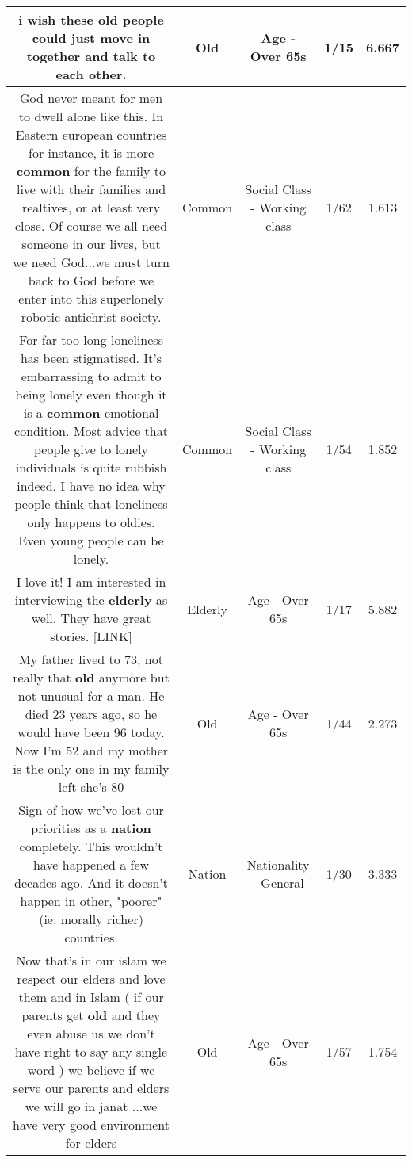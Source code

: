 \documentclass[11pt]{article}
\newlength\mylength
\begin{document}
\begin{center}
\begin{longtable}{|C{.65\mylength}|C{.30\mylength}|C{.12\mylength}|C{.12\mylength}|C{.12\mylength}|}
  \small i wish these \textbf{old} people could just move in together and talk to each other.\normalsize   & Old & Age - Over 65s & 1/15 & 6.667 \\  \hline
  \small God never meant for men to dwell alone like this. In Eastern european countries for instance, it is more \textbf{common} for the family to live with their families and realtives, or at least very close. Of course we all need someone in our lives, but we need God...we must turn back to God before we enter into this superlonely robotic antichrist society.\normalsize   & Common & Social Class - Working class & 1/62 & 1.613 \\  \hline
  \small For far too long loneliness has been stigmatised. It's embarrassing to admit to being lonely even though it is a \textbf{common} emotional condition. Most advice that people give to lonely individuals is quite rubbish indeed.  I have no idea why people think that loneliness only happens to oldies.   Even young people can be lonely.\normalsize   & Common & Social Class - Working class & 1/54 & 1.852 \\  \hline
  \small I love it! I am interested in interviewing the \textbf{elderly} as well. They have great stories.  [LINK] \normalsize   & Elderly & Age - Over 65s & 1/17 & 5.882 \\  \hline
  \small My father lived to 73, not really that \textbf{old} anymore but not unusual for a man. He died 23 years ago, so he would have been 96 today. Now I'm 52 and my mother is the only one in my family left she's 80\normalsize   & Old & Age - Over 65s & 1/44 & 2.273 \\  \hline
  \small Sign of how we've lost our priorities as a \textbf{nation} completely. This wouldn't have happened a few decades ago. And it doesn't happen in other, "poorer" (ie: morally richer) countries.\normalsize   & Nation & Nationality - General & 1/30 & 3.333 \\  \hline
  \small Now that's in our islam we respect our elders and love them and in Islam ( if our parents get \textbf{old} and they even abuse us we don't have right to say any single word ) we believe if we serve our parents and elders we will go in janat ...we have very good environment for elders\normalsize   & Old & Age - Over 65s & 1/57 & 1.754 \\  \hline

\end{longtable}
\end{center}
\end{document}
